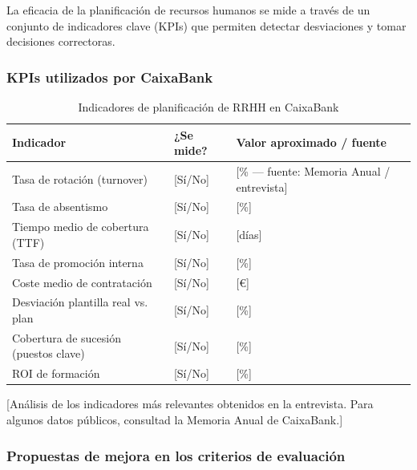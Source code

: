 La eficacia de la planificación de recursos humanos se mide a través de
un conjunto de indicadores clave (KPIs) que permiten detectar desviaciones
y tomar decisiones correctoras.

\subsubsection{KPIs utilizados por CaixaBank}

\begin{table}[H]
  \centering
  \small
  \caption{Indicadores de planificación de RRHH en CaixaBank}
  \begin{tabularx}{\textwidth}{p{} p{} X}
    \toprule
    \textbf{Indicador}                    & \textbf{¿Se mide?} & \textbf{Valor aproximado / fuente} \\
    \midrule
    Tasa de rotación (turnover)           & [Sí/No] & [\% — fuente: Memoria Anual / entrevista] \\
    Tasa de absentismo                    & [Sí/No] & [\%] \\
    Tiempo medio de cobertura (TTF)       & [Sí/No] & [días] \\
    Tasa de promoción interna             & [Sí/No] & [\%] \\
    Coste medio de contratación           & [Sí/No] & [\euro{}] \\
    Desviación plantilla real vs. plan    & [Sí/No] & [\%] \\
    Cobertura de sucesión (puestos clave) & [Sí/No] & [\%] \\
    ROI de formación                      & [Sí/No] & [\%] \\
    \bottomrule
  \end{tabularx}
\end{table}

[Análisis de los indicadores más relevantes obtenidos en la entrevista.
Para algunos datos públicos, consultad la Memoria Anual de CaixaBank.]

\subsubsection{Propuestas de mejora en los criterios de evaluación}


